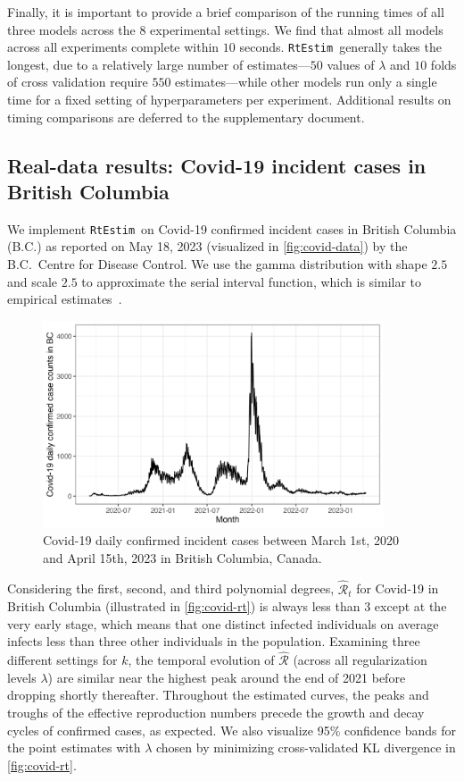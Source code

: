 \documentclass[10pt,letterpaper]{article}
\def\RtEstim{\texttt{RtEstim}}
\def\calR{\mathcal{R}}
\newcommand{\citep}[1]{\cite{#1}}
\begin{document}
Finally, it is important to provide a brief comparison of the running times of
all three models across the $8$ experimental settings. We find that almost all
models across all experiments complete within $10$ seconds. \RtEstim\ generally
takes the longest, due to a relatively large number of estimates---$50$ values
of $\lambda$ and $10$ folds of cross validation require $550$ estimates---while
other models run only a single time for a fixed setting of hyperparameters per
experiment. Additional results on timing comparisons are deferred to the
supplementary document. 


\subsection{Real-data results: Covid-19 incident cases in British Columbia}

We implement \RtEstim\ on Covid-19 confirmed incident cases in British Columbia
(B.C.) as reported on May 18, 2023 (visualized in \autoref{fig:covid-data}) by
the B.C.\ Centre for Disease Control. We use the gamma distribution with shape
$2.5$ and scale $2.5$ to approximate the serial interval function, which is
similar to empirical estimates~\citep{lehtinen2021relationship}. 

\begin{figure}[!h]
  \centering
  \includegraphics[width=0.9\textwidth]{fig/covid_dat.png}
  \caption{Covid-19 daily confirmed incident cases between March 1st, 
  2020 and April 15th, 2023 in British Columbia, Canada.} 
  \label{fig:covid-data}
\end{figure} 

Considering the first, second, and third polynomial degrees, $\widehat{\calR}_t$
for Covid-19 in British Columbia (illustrated in \autoref{fig:covid-rt}) is
always less than $3$ except at the very early stage, which means that one
distinct infected individuals on average infects less than three other
individuals in the population. Examining three different settings for $k$, the
temporal evolution of $\widehat{\calR}$ (across all regularization levels
$\lambda$) are similar near the highest peak around the end of 2021 before
dropping shortly thereafter. Throughout the estimated curves, the peaks and
troughs of the effective reproduction numbers precede the growth and decay cycles of
confirmed cases, as expected. We also visualize 95\% confidence bands for the
point estimates with $\lambda$ chosen by minimizing cross-validated KL
divergence in \autoref{fig:covid-rt}.     
\end{document}
